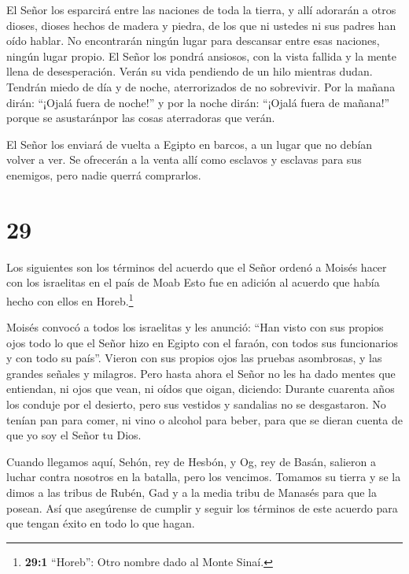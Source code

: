 El Señor los esparcirá entre las naciones de toda la
tierra, y allí adorarán a otros dioses, dioses hechos de madera y
piedra, de los que ni ustedes ni sus padres han oído hablar.
 No encontrarán ningún lugar para descansar entre esas
naciones, ningún lugar propio. El Señor los pondrá ansiosos, con la
vista fallida y la mente llena de desesperación.  Verán su
vida pendiendo de un hilo mientras dudan. Tendrán miedo de día y de
noche, aterrorizados de no sobrevivir.  Por la mañana
dirán: ``¡Ojalá fuera de noche!'' y por la noche dirán: ``¡Ojalá fuera
de mañana!'' porque se asustaránpor las cosas aterradoras que verán.

 El Señor los enviará de vuelta a Egipto en barcos, a un
lugar que no debían volver a ver. Se ofrecerán a la venta allí como
esclavos y esclavas para sus enemigos, pero nadie querrá comprarlos.

\hypertarget{section-28}{%
\section{29}\label{section-28}}

 Los siguientes son los términos del acuerdo que el Señor
ordenó a Moisés hacer con los israelitas en el país de Moab Esto fue en
adición al acuerdo que había hecho con ellos en Horeb.\footnote{\textbf{29:1}
  ``Horeb'': Otro nombre dado al Monte Sinaí.}

 Moisés convocó a todos los israelitas y les anunció: ``Han
visto con sus propios ojos todo lo que el Señor hizo en Egipto con el
faraón, con todos sus funcionarios y con todo su país''. 
Vieron con sus propios ojos las pruebas asombrosas, y las grandes
señales y milagros.  Pero hasta ahora el Señor no les ha
dado mentes que entiendan, ni ojos que vean, ni oídos que oigan,
diciendo:  Durante cuarenta años los conduje por el
desierto, pero sus vestidos y sandalias no se desgastaron. 
No tenían pan para comer, ni vino o alcohol para beber, para que se
dieran cuenta de que yo soy el Señor tu Dios.

 Cuando llegamos aquí, Sehón, rey de Hesbón, y Og, rey de
Basán, salieron a luchar contra nosotros en la batalla, pero los
vencimos.  Tomamos su tierra y se la dimos a las tribus de
Rubén, Gad y a la media tribu de Manasés para que la posean.
 Así que asegúrense de cumplir y seguir los términos de este
acuerdo para que tengan éxito en todo lo que hagan.

